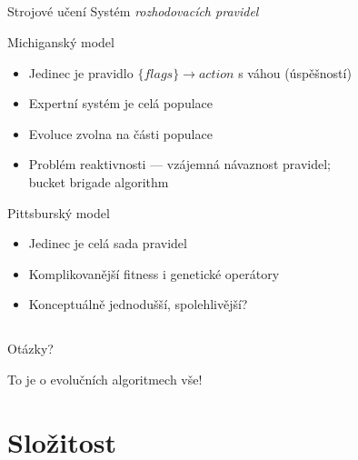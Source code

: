 \documentclass{beamer}
\begin{document}
\subsection{}
\begin{frame}{Strojové učení}
Systém {\em rozhodovacích pravidel}

\begin{block}{Michiganský model}
\begin{itemize}
\item Jedinec je pravidlo $\{flags\} \to action$ s váhou (úspěšností)
\item Expertní systém je celá populace
\item Evoluce zvolna na části populace
\item Problém reaktivnosti --- vzájemná návaznost pravidel; \\ bucket brigade algorithm
\end{itemize}
\end{block}

\begin{block}{Pittsburský model}
\begin{itemize}
\item Jedinec je celá sada pravidel
\item Komplikovanější fitness i genetické operátory
\item Konceptuálně jednodušší, spolehlivější?
\end{itemize}
\end{block}
\end{frame}

\subsection{}
\begin{frame}{Otázky?}
\begin{center}
To je o evolučních algoritmech vše!
\end{center}
\end{frame}

\section{Složitost}
\end{document}
